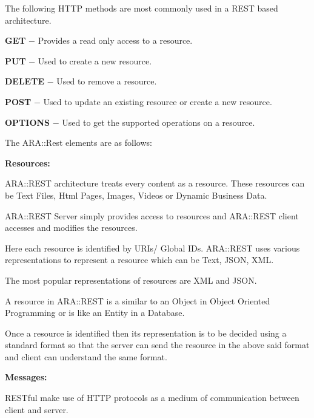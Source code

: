  
\begin{DoxyItemize}
\item The following H\+T\+TP methods are most commonly used in a R\+E\+ST based architecture.
\begin{DoxyItemize}
\item {\bfseries G\+ET} − Provides a read only access to a resource.
\item {\bfseries P\+UT} − Used to create a new resource.
\item {\bfseries D\+E\+L\+E\+TE} − Used to remove a resource.
\item {\bfseries P\+O\+ST} − Used to update an existing resource or create a new resource.
\item {\bfseries O\+P\+T\+I\+O\+NS} − Used to get the supported operations on a resource.
\end{DoxyItemize}
\item The A\+R\+A\+::\+Rest elements are as follows\+:
\begin{DoxyItemize}
\item {\bfseries Resources\+:}
\begin{DoxyItemize}
\item A\+R\+A\+::\+R\+E\+ST architecture treats every content as a resource. These resources can be Text Files, Html Pages, Images, Videos or Dynamic Business Data.
\item A\+R\+A\+::\+R\+E\+ST Server simply provides access to resources and A\+R\+A\+::\+R\+E\+ST client accesses and modifies the resources.
\item Here each resource is identified by U\+R\+Is/ Global I\+Ds. A\+R\+A\+::\+R\+E\+ST uses various representations to represent a resource which can be Text, J\+S\+ON, X\+ML.
\item The most popular representations of resources are X\+ML and J\+S\+ON.
\item A resource in A\+R\+A\+::\+R\+E\+ST is a similar to an Object in Object Oriented Programming or is like an Entity in a Database.
\item Once a resource is identified then its representation is to be decided using a standard format so that the server can send the resource in the above said format and client can understand the same format.
\end{DoxyItemize}
\item {\bfseries Messages\+:}
\begin{DoxyItemize}
\item R\+E\+S\+Tful make use of H\+T\+TP protocols as a medium of communication between client and server.

\end{DoxyItemize}
\end{DoxyItemize}
\end{DoxyItemize}
